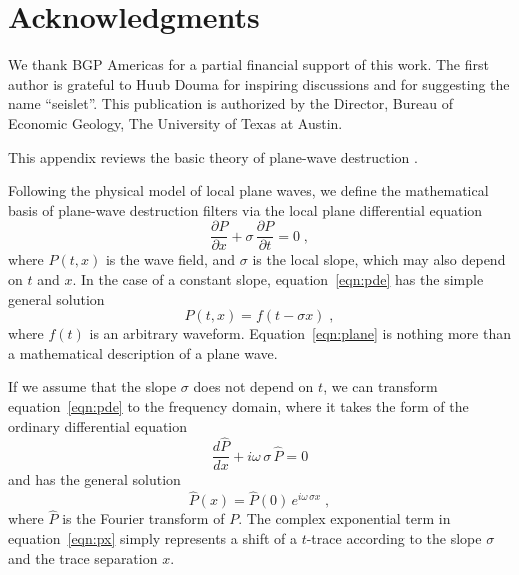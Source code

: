 \section{Acknowledgments}

We thank BGP Americas for a partial financial support of this work. The first
author is grateful to Huub Douma for inspiring discussions and for suggesting 
the name ``seislet''. This publication is authorized by the Director, Bureau 
of Economic Geology, The University of Texas at Austin.



{This appendix reviews the basic theory of plane-wave destruction 
\cite[]{GEO67-06-19461960}.}

{Following the physical model of local plane waves, we 
define the mathematical basis of plane-wave destruction filters via
the local plane differential equation \cite[]{pvi}
\begin{equation}
  {\frac{\partial P}{\partial x}} +
  {\sigma\,\frac{\partial P}{\partial t}} = 0\;,
  \label{eqn:pde}
\end{equation}
where $P(t,x)$ is the wave field, and $\sigma$ is the local slope, which may
also depend on $t$ and $x$. In the case of a constant slope,
equation~\ref{eqn:pde} has the simple general solution
\begin{equation}
  \label{eqn:plane}
  P(t,x) = f(t - \sigma x)\;,
\end{equation}
where $f(t)$ is an arbitrary waveform. Equation~\ref{eqn:plane} is
nothing more than a mathematical description of a plane wave.}

{If we assume that the slope $\sigma$ does not depend on $t$, we can
transform equation~\ref{eqn:pde} to the frequency domain, where it
takes the form of the ordinary differential equation
\begin{equation}
  {\frac{d \hat{P}}{d x}} +
  i \omega\,\sigma\, \hat{P} = 0
  \label{eqn:ode}
\end{equation}
and has the general solution
\begin{equation}
  \label{eqn:px}
  \hat{P} (x) = \hat{P} (0)\,e^{i \omega\,\sigma x}\;,
\end{equation}
where $\hat{P}$ is the Fourier transform of $P$. The complex
exponential term in equation~\ref{eqn:px} simply represents a shift
of a $t$-trace according to the slope $\sigma$ and the trace separation
$x$.}

